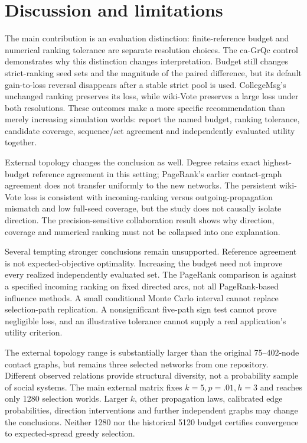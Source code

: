 \documentclass[smallextended]{svjour3}
\begin{document}
\section{Discussion and limitations}
The main contribution is an evaluation distinction: finite-reference budget and numerical ranking tolerance are separate resolution choices. The ca-GrQc control demonstrates why this distinction changes interpretation. Budget still changes strict-ranking seed sets and the magnitude of the paired difference, but its default gain-to-loss reversal disappears after a stable strict pool is used. CollegeMsg's unchanged ranking preserves its loss, while wiki-Vote preserves a large loss under both resolutions. These outcomes make a more specific recommendation than merely increasing simulation worlds: report the named budget, ranking tolerance, candidate coverage, sequence/set agreement and independently evaluated utility together.

External topology changes the conclusion as well. Degree retains exact highest-budget reference agreement in this setting; PageRank's earlier contact-graph agreement does not transfer uniformly to the new networks. The persistent wiki-Vote loss is consistent with incoming-ranking versus outgoing-propagation mismatch and low full-seed coverage, but the study does not causally isolate direction. The precision-sensitive collaboration result shows why direction, coverage and numerical ranking must not be collapsed into one explanation.

Several tempting stronger conclusions remain unsupported. Reference agreement is not expected-objective optimality. Increasing the budget need not improve every realized independently evaluated set. The PageRank comparison is against a specified incoming ranking on fixed directed arcs, not all PageRank-based influence methods. A small conditional Monte Carlo interval cannot replace selection-path replication. A nonsignificant five-path sign test cannot prove negligible loss, and an illustrative tolerance cannot supply a real application's utility criterion.

The external topology range is substantially larger than the original 75--402-node contact graphs, but remains three selected networks from one repository. Different observed relations provide structural diversity, not a probability sample of social systems. The main external matrix fixes $k=5,p=.01,h=3$ and reaches only 1280 selection worlds. Larger $k$, other propagation laws, calibrated edge probabilities, direction interventions and further independent graphs may change the conclusions. Neither 1280 nor the historical 5120 budget certifies convergence to expected-spread greedy selection.
\end{document}
